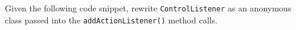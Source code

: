 Given the following code snippet, rewrite \texttt{ControlListener} as an anonymous class passed into the \texttt{addActionListener()} method calls.



\begin{answer}



\end{answer}